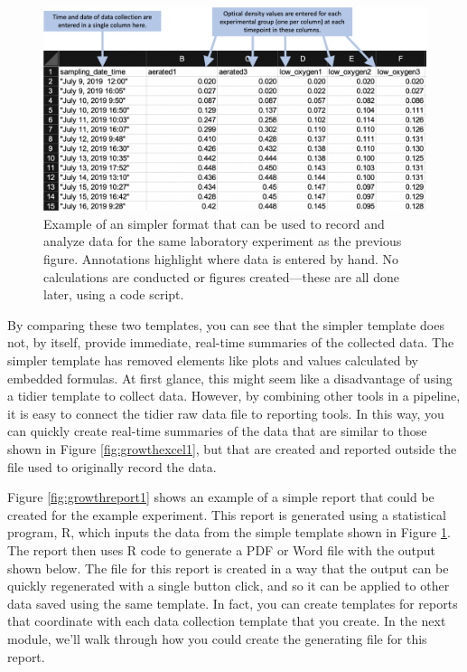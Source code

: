 \documentclass[]{tufte-book}
\begin{document}
\begin{figure}
\includegraphics[width=\textwidth]{figures/growth_curve_simple} \caption[Example of an simpler format that can be used to record and analyze data for the same laboratory experiment as the previous figure]{Example of an simpler format that can be used to record and analyze data for the same laboratory experiment as the previous figure. Annotations highlight where data is entered by hand. No calculations are conducted or figures created---these are all done later, using a code script.}\label{fig:growthsimple1}
\end{figure}

By comparing these two templates, you can see that the simpler template does
not, by itself, provide immediate, real-time summaries of the collected data. The
simpler template has removed elements like plots and values calculated by embedded
formulas. At first glance, this might seem like a disadvantage of using a tidier
template to collect data. However, by combining other tools in a pipeline, it is
easy to connect the tidier raw data file to reporting tools. In this way, you can
quickly create real-time summaries of the data that are similar to those shown in
Figure \ref{fig:growthexcel1}, but that are created and reported outside the file
used to originally record the data.

Figure \ref{fig:growthreport1} shows an example of a simple report that could
be created for the example experiment. This report is generated using a
statistical program, R, which inputs the data from the simple template shown in
Figure \ref{fig:growthsimple1}. The report then uses R code to generate a PDF
or Word file with the output shown below. The file for this report is created in
a way that the output can be quickly regenerated with a single button click, and
so it can be applied to other data saved using the same template. In fact, you can
create templates for reports that coordinate with each data collection template
that you create. In the next module, we'll walk through how you could create
the generating file for this report.
\end{document}
